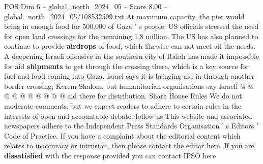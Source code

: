 \begin{textsample}{POS Dim 6 – global\_north\_2024\_05 – Score 8.00 – global\_north\_2024\_05/108532599.txt}
At maximum capacity, the pier would bring in enough food for 500,000 of Gaza ' s people.
US officials stressed the need for open land crossings for the remaining 1.8 million.
The US has also planned to continue to provide \textbf{airdrops} of food, which likewise can not meet all the needs.
A deepening Israeli offensive in the southern city of Rafah has made it impossible for aid \textbf{shipments} to get through the crossing there, which is a key source for fuel and food coming into Gaza.
Israel says it is bringing aid in through another border crossing, Kerem Shalom, but humanitarian organisations say Israeli @ @ @ @ @ @ @ @ @ @ aid there for distribution.
Share House Rules We do not moderate comments, but we expect readers to adhere to certain rules in the interests of open and accountable debate. follow us This website and associated newspapers adhere to the Independent Press Standards Organisation ' s Editors ' Code of Practice.
If you have a complaint about the editorial content which relates to inaccuracy or intrusion, then please contact the editor here.
If you are \textbf{dissatisfied} with the response provided you can contact IPSO here

\end{textsample}
